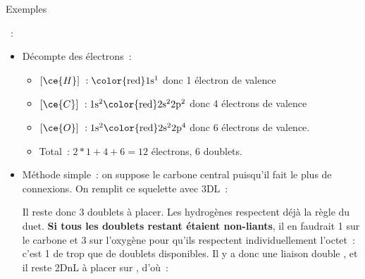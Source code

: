 \documentclass[../main/main.tex]{subfiles}
\begin{document}
\begin{rexem}{Exemples}
    \begin{enumerate}
        ~:
            \begin{itemize}[label=$\triangleright$, leftmargin=20pt]
                \item Décompte des électrons~:
                    \begin{itemize}[label=$\ra$, leftmargin=20pt]
                        \item $[\ce{H}]~: \rm \color{red}1s^1$
                            donc 1 électron de valence
                        \item $[\ce{C}]~: \rm 1s^2\color{red}2s^22p^2$
                            donc 4 électrons de valence
                        \item $[\ce{O}]~: \rm 1s^2\color{red}2s^22p^4$
                            donc 6 électrons de valence.
                        \item Total~: $2*1 + 4 + 6 = 12$ électrons, 6
                            doublets.
                    \end{itemize}
                \item Méthode simple~: on suppose le carbone central puisqu'il
                    fait le plus de connexions. On remplit ce squelette avec
                    3DL~:
                    \begin{center}
                    \end{center}
                    Il reste donc 3 doublets à placer. Les hydrogènes respectent
                    déjà la règle du duet. \textbf{Si tous les doublets restant
                    étaient non-liants}, il en faudrait 1 sur le carbone et 3
                    sur l'oxygène pour qu'ils respectent individuellement
                    l'octet~: c'est 1 de trop que de doublets disponibles. Il y
                    a donc une liaison double , et il reste 2DnL à
                    placer sur , d'où~:
            \end{itemize}
    \end{enumerate}
    \begin{center}
    \end{center}

\end{rexem}
\end{document}
